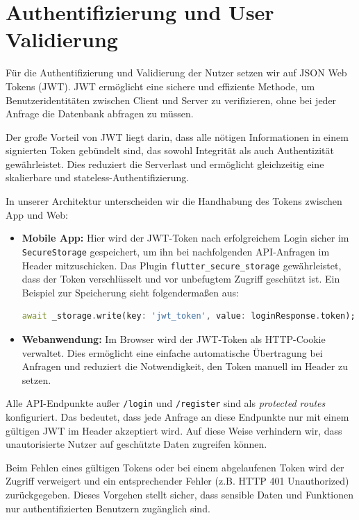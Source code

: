 \documentclass[11pt,a4paper]{article}
\begin{document}
\section{Authentifizierung und User Validierung}

Für die Authentifizierung und Validierung der Nutzer setzen wir auf JSON Web Tokens (JWT). JWT ermöglicht eine sichere und effiziente Methode, um Benutzeridentitäten zwischen Client und Server zu verifizieren, ohne bei jeder Anfrage die Datenbank abfragen zu müssen.

Der große Vorteil von JWT liegt darin, dass alle nötigen Informationen in einem signierten Token gebündelt sind, das sowohl Integrität als auch Authentizität gewährleistet. Dies reduziert die Serverlast und ermöglicht gleichzeitig eine skalierbare und stateless-Authentifizierung.

In unserer Architektur unterscheiden wir die Handhabung des Tokens zwischen App und Web:

\begin{itemize}
    \item \textbf{Mobile App:} Hier wird der JWT-Token nach erfolgreichem Login sicher im \texttt{SecureStorage} gespeichert, um ihn bei nachfolgenden API-Anfragen im Header mitzuschicken. Das Plugin \texttt{flutter\_secure\_storage}\cite{flutter_secure_storage} gewährleistet, dass der Token verschlüsselt und vor unbefugtem Zugriff geschützt ist. Ein Beispiel zur Speicherung sieht folgendermaßen aus:

\begin{lstlisting}[language=Dart, caption=Speichern des JWT Tokens im Secure Storage]
await _storage.write(key: 'jwt_token', value: loginResponse.token);
\end{lstlisting}

    \item \textbf{Webanwendung:} Im Browser wird der JWT-Token als HTTP-Cookie verwaltet. Dies ermöglicht eine einfache automatische Übertragung bei Anfragen und reduziert die Notwendigkeit, den Token manuell im Header zu setzen.
\end{itemize}

Alle API-Endpunkte außer \texttt{/login} und \texttt{/register} sind als \textit{protected routes} konfiguriert. Das bedeutet, dass jede Anfrage an diese Endpunkte nur mit einem gültigen JWT im Header akzeptiert wird. Auf diese Weise verhindern wir, dass unautorisierte Nutzer auf geschützte Daten zugreifen können.

Beim Fehlen eines gültigen Tokens oder bei einem abgelaufenen Token wird der Zugriff verweigert und ein entsprechender Fehler (z.B. HTTP 401 Unauthorized) zurückgegeben. Dieses Vorgehen stellt sicher, dass sensible Daten und Funktionen nur authentifizierten Benutzern zugänglich sind.
\end{document}

